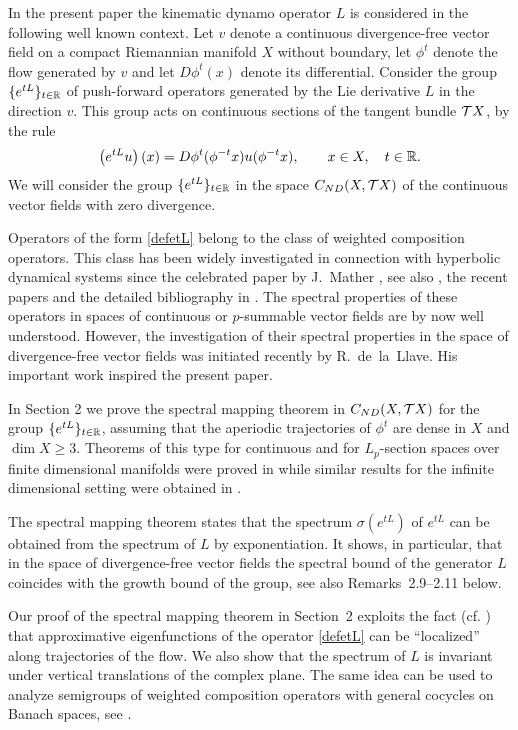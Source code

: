 In the present paper the kinematic dynamo
operator $L$ is considered in the following  well known
context. Let $v$ denote a
continuous divergence-free vector field on
a compact Riemannian manifold $X$ without boundary, let
$\phi^t$ denote the flow generated by $v$ and let
$D\phi^t(x)$  denote its differential.
Consider the group $\{e^{tL}\}_{t\in{\Bbb{R}}}$ of push-forward
operators generated by the  Lie derivative $L$ in the direction
$v$.
This group acts on  continuous sections
of the tangent bundle ${{\cal{T}}X}$,
by the rule
\begin{equation}\label{defetL}
\left(e^{tL}u\right)(x)=
D\phi^t(\phi^{-t}x)u(\phi^{-t}x),\qquad x\in X,\quad t\in{\Bbb{R}}.
\end{equation}
We will consider
the group $\{e^{tL}\}_{t\in{\Bbb{R}}}$ in the space
$C_{ND}(X,{{\cal{T}}X})$ of the  continuous
vector fields with zero divergence.

Operators of the form \eqref{defetL} belong to the class of
weighted composition operators. This class has been widely investigated
in connection with hyperbolic dynamical systems
since the celebrated paper by
J.~Mather \cite{Mather},
see also \cite{HPS,Pesin}, the recent papers \cite{CL,LMS1,LMS2,Rau}
and the detailed bibliography in \cite{LS}.
The spectral
properties of these operators in  spaces of continuous or
$p$-summable  vector  fields
are by now well understood.
However, the investigation of their spectral properties in the
space of divergence-free vector fields
was initiated recently by R.~de~la~Llave.
His important work \cite{Rafael}
inspired the present paper.

In Section 2 we  prove the spectral mapping
theorem in ${C_{ND}(X,{{\cal{T}}X})}$ for the
group $\{e^{tL}\}_{t\in{\Bbb{R}}}$,
assuming that the aperiodic trajectories of $\phi^t$ are
dense in $X$ and $\dim X \geq 3$.
Theorems of this type for continuous and
for  $L_p$-section spaces over finite dimensional manifolds
were proved in \cite{CS,J} while
similar results for the infinite dimensional
setting were obtained in
\cite{LMS1,LMS2,LS}.

The spectral mapping theorem states that
the spectrum $\sigma(e^{tL})$ of $e^{tL}$
can be obtained  from the spectrum of $L$ by
exponentiation. It shows, in particular, that in the space of
divergence-free vector fields the spectral bound  of
the generator $L$ coincides with the
growth bound  of the
group, see also Remarks~2.9--2.11 below.

Our proof of the spectral mapping theorem in Section~2
exploits the fact (cf. \cite{Mather,Rafael}) that
approximative eigenfunctions of the operator \eqref{defetL} can be
``localized'' along trajectories of the flow.
We also show that the
spectrum of $L$ is invariant under vertical translations of the
complex plane.
The same
idea can be used to analyze
semigroups of weighted composition
operators with general
cocycles on Banach spaces, see \cite{LMSR}.

